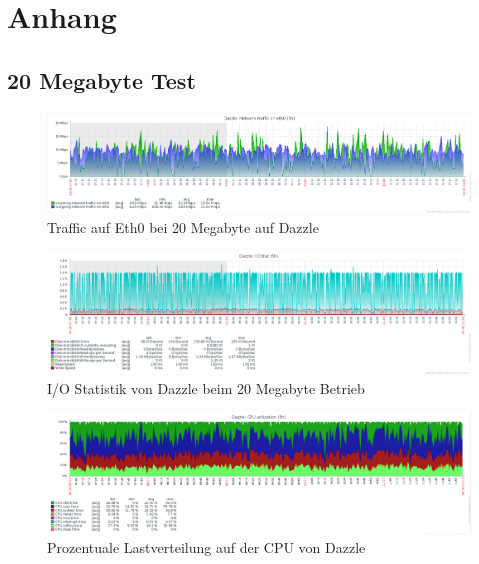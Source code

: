 \chapter{Anhang}
\label{cha:anhang}

\section{20 Megabyte Test}

\begin{figure}[htbp]
\centering
\includegraphics*[width=0.9\linewidth, angle=90]{Abb/ZabbixDazzle/Standard/Standard20}

\caption{Traffic auf Eth0 bei 20 Megabyte auf Dazzle}
\label{fig:Eth0DazzleStandard}
\end{figure}


\begin{figure}[htbp]
\centering
\includegraphics*[width=0.9\linewidth, angle=90]{Abb/ZabbixDazzle/Standard/IoStatStandard20}

\caption{I/O Statistik von Dazzle beim 20 Megabyte Betrieb}
\label{fig:IoStatDazzleStandard}
\end{figure} %

\begin{figure}[htbp]
\centering
\includegraphics*[width=0.9\linewidth, angle=90]{Abb/ZabbixDazzle/Standard/CPUStandard20}

\caption{Prozentuale Lastverteilung auf der CPU von Dazzle}
\label{fig:CPUDazzleStandard}
\end{figure}


